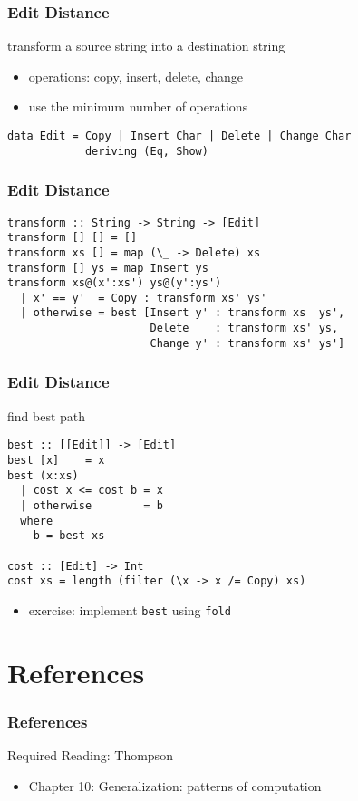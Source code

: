 \documentclass[dvipsnames]{beamer}
\theoremstyle{plain}
\begin{document}
\begin{frame}[fragile]
  \frametitle{Edit Distance}

  \begin{exampleblock}{transform a source string into a destination string}
    \begin{itemize}
      \item operations: copy, insert, delete, change
      \item use the minimum number of operations
    \end{itemize}

    \begin{lstlisting}
data Edit = Copy | Insert Char | Delete | Change Char
            deriving (Eq, Show)
    \end{lstlisting}
  \end{exampleblock}
\end{frame}

\begin{frame}[fragile]
  \frametitle{Edit Distance}

  \begin{exampleblock}{}
    \begin{lstlisting}
transform :: String -> String -> [Edit]
transform [] [] = []
transform xs [] = map (\_ -> Delete) xs
transform [] ys = map Insert ys
transform xs@(x':xs') ys@(y':ys')
  | x' == y'  = Copy : transform xs' ys'
  | otherwise = best [Insert y' : transform xs  ys',
                      Delete    : transform xs' ys,
                      Change y' : transform xs' ys']
    \end{lstlisting}
  \end{exampleblock}
\end{frame}

\begin{frame}[fragile]
  \frametitle{Edit Distance}

  \begin{exampleblock}{find best path}
    \begin{lstlisting}
best :: [[Edit]] -> [Edit]
best [x]    = x
best (x:xs)
  | cost x <= cost b = x
  | otherwise        = b
  where
    b = best xs

cost :: [Edit] -> Int
cost xs = length (filter (\x -> x /= Copy) xs)
    \end{lstlisting}
  \end{exampleblock}

  \pause
  \begin{itemize}
    \item exercise: implement \lstinline|best| using \lstinline|fold|
  \end{itemize}
\end{frame}

\section*{References}

\begin{frame}
  \frametitle{References}

  \begin{block}{Required Reading: Thompson}
    \begin{itemize}
      \item Chapter 10: \alert{Generalization: patterns of computation}
    \end{itemize}
  \end{block}
\end{frame}
\end{document}
